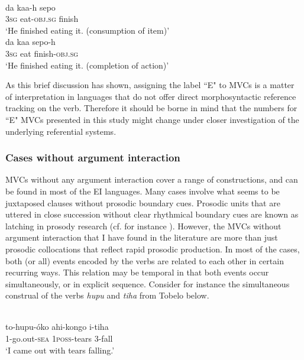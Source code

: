 \ea 
{}\\
\ea \label{Buru4}
\gll da kaa-h sepo \\
3\textsc{sg} eat-\textsc{obj}.\textsc{sg} finish \\
\glft `He finished eating it. (consumption of item)' \\ 
\ex \label{Buru5}
\gll da kaa sepo-h \\ 
3\textsc{sg} eat finish-\textsc{obj}.\textsc{sg} \\
\glft `He finished eating it. (completion of action)'\\ 
\z
\z

As this brief discussion has shown, assigning the label ``E" to MVCs is a matter of interpretation in languages that do not offer direct morphosyntactic reference tracking on the verb. Therefore it should be borne in mind that the numbers for ``E" MVCs presented in this study might change under closer investigation of the underlying referential systems.

\subsubsection{Cases without argument interaction}

MVCs without any argument interaction cover a range of constructions, and can be found in most of the EI languages. Many cases involve what seems to be juxtaposed clauses without prosodic boundary cues. Prosodic units that are uttered in close succession without clear rhythmical boundary cues are known as latching in prosody research (cf. for instance \citealt{himmelmann2018}). However, the MVCs without argument interaction that I have found in the literature are more than just prosodic collocations that reflect rapid prosodic production. In most of the cases, both (or all) events encoded by the verbs are related to each other in certain recurring ways. This relation may be temporal in that both events occur simultaneously, or in explicit sequence.  Consider for instance the simultaneous construal of the verbs \textit{hupu} and \textit{tiha} from Tobelo below.

\ea \label{}
\\
\gll to-hupu-óko ahi-kongo i-tiha \\
1-go.out-\textsc{sea} 1\textsc{poss}-tears 3-fall \\
\glft `I came out with tears falling.'\\ 
\z

